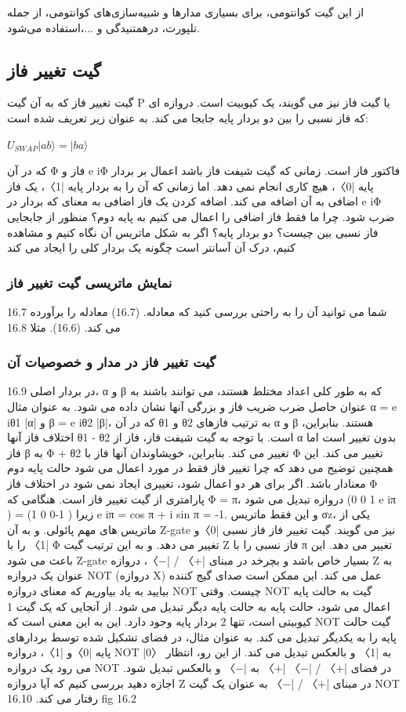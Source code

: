 \documentclass{book}
\begin{document}
از این گیت کوانتومی‌، برای بسیاری مدار‌ها و شبیه‌سازی‌های کوانتومی، از جمله تلپورت، درهمتنیدگی و ...،استفاده می‌شود.

\subsection*{گیت تغییر فاز}
گیت تغییر فاز که به آن گیت P یا گیت فاز نیز می گویند، یک کیوبیت است.
دروازه ای که فاز نسبی را بین دو بردار پایه جابجا می کند. به عنوان زیر تعریف شده است:
\begin{center}
	$U_{SWAP} \vert ab \rangle = \vert ba \rangle$
\end{center}


که در آن Φ فاز و e iΦ فاکتور فاز است. زمانی که گیت شیفت فاز باشد
اعمال بر بردار پایه |0〉، هیچ کاری انجام نمی دهد. اما زمانی که آن را به
بردار پایه |1〉، یک فاز اضافی به آن اضافه می کند. اضافه کردن یک فاز اضافی به معنای
که بردار در e iΦ ضرب شود. چرا ما فقط فاز اضافی را اعمال می کنیم
به پایه دوم؟ منظور از جابجایی فاز نسبی بین چیست؟
دو بردار پایه؟ اگر به شکل ماتریس آن نگاه کنیم و مشاهده کنیم، درک آن آسانتر است
چگونه یک بردار کلی را ایجاد می کند


\subsubsection{نمایش ماتریسی گیت تغییر فاز}
16.7
شما می توانید آن را به راحتی بررسی کنید که معادله. (16.7) معادله را برآورده می کند. (16.6). مثلا
16.8

\subsubsection{گیت تغییر فاز در مدار و خصوصیات آن}
16.9
در بردار اصلی، α و β که به طور کلی اعداد مختلط هستند، می توانند باشند
به عنوان حاصل ضرب ضریب فاز و بزرگی آنها نشان داده می شود. به عنوان مثال α =
e iθ1 |α| و β = e iθ2 |β|، که در آن θ1 و θ2 به ترتیب فازهای α و β هستند.
بنابراین، اختلاف فاز آنها θ1 - θ2 است. با توجه به گیت شیفت فاز، فاز
از α بدون تغییر است اما فاز β به Φ + θ2 تغییر می کند. بنابراین، خویشاوندان آنها
فاز با Φ تغییر می کند. این همچنین توضیح می دهد که چرا تغییر فاز فقط در مورد اعمال می شود
حالت پایه دوم معنادار باشد. اگر برای هر دو اعمال شود، تغییری ایجاد نمی شود
در اختلاف فاز
Φ پارامتری از گیت تغییر فاز است. هنگامی که Φ = π، دروازه تبدیل می شود (1 0
0 e iπ
)
=
(1 0
0-1
)
زیرا e iπ = cos π + i sin π = -1. و این فقط
ماتریس σz، یکی از ماتریس های مهم پائولی. و به آن Z-gate نیز می گویند.
گیت تغییر فاز فاز نسبی |0〉و |1〉 را با Φ تغییر می دهد. و به این ترتیب
گیت Z فاز نسبی را با π تغییر می دهد. این باعث می شود Z-gate بسیار خاص باشد و بچرخد
در مبنای |+〉 / |−〉، دروازه Z به عنوان یک دروازه NOT (دروازه X) عمل می کند. این ممکن است
صدای گیج کننده بیایید به یاد بیاوریم که معنای دروازه NOT چیست. وقتی NOT
گیت به حالت پایه اعمال می شود، حالت پایه به حالت پایه دیگر تبدیل می شود.
از آنجایی که یک گیت 1 کیوبیتی است، تنها 2 بردار پایه وجود دارد. این به این معنی است که NOT
گیت حالت پایه را به یکدیگر تبدیل می کند. به عنوان مثال، در فضای تشکیل شده توسط
بردارهای پایه |0〉و |1〉، دروازه NOT |0〉 به |1〉 و بالعکس تبدیل می کند. از این رو،
انتظار می رود یک دروازه NOT در فضای |+〉 / |−〉 |+〉 ​​به |−〉 و بالعکس تبدیل شود.
اجازه دهید بررسی کنیم که آیا دروازه Z در مبنای |+〉 / |−〉 به عنوان یک گیت NOT رفتار می کند.
16.10
fig 16.2
\end{document}
